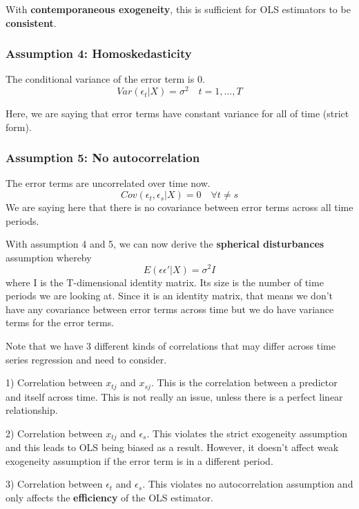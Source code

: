 \documentclass[11pt, oneside]{article}
\theoremstyle{definition}
\begin{document}
With \textbf{contemporaneous exogeneity}, this is sufficient for OLS estimators to be \textbf{consistent}.

\subsubsection{Assumption 4: Homoskedasticity}
The conditional variance of the error term is 0.
\begin{equation}
  Var(\epsilon_t|X) = \sigma^2 \quad  t = 1,...,T
\end{equation}

Here, we are saying that error terms have constant variance for all of time (strict form).
\subsubsection{Assumption 5: No autocorrelation}
The error terms are uncorrelated over time now.
\begin{equation}
  Cov(\epsilon_t,\epsilon_s |X) = 0 \quad  \forall t \neq s
\end{equation}
We are saying here that there is no covariance between error terms across all time periods.

With assumption 4 and 5, we can now derive the \textbf{spherical disturbances} assumption whereby
\begin{equation}
  E(\epsilon\epsilon'|X) = \sigma^2I
\end{equation}
where I is the T-dimensional identity matrix. Its size is the number of time periods we are looking at. Since it is an identity matrix, that means we don't have any covariance between error terms across time but we do have variance terms for the error terms.

Note that we have 3 different kinds of correlations that may differ across time series regression and need to consider.

1) Correlation between $x_{tj}$ and $x_{sj}$. This is the correlation between a predictor and itself across time. This is not really an issue, unless there is a perfect linear relationship.

2) Correlation between $x_{tj}$ and $\epsilon_s$. This violates the strict exogeneity assumption and this leads to OLS being biased as a result. However, it doesn't affect weak exogeneity assumption if the error term is in a different period.

3) Correlation between $\epsilon_t$ and $\epsilon_s$. This violates no autocorrelation assumption and only affects the \textbf{efficiency} of the OLS estimator.
\end{document}
